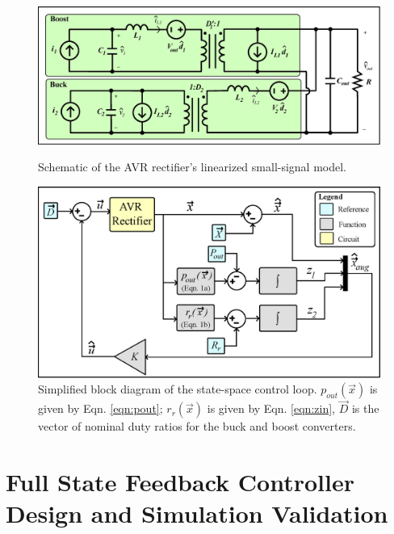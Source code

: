 \documentclass[journal, onecolumn, final, letterpaper, 11pt]{IEEEtran}
\begin{document}
\begin{figure}[b]
\vspace{-0.4 cm}
\centering
\begin{minipage}{.5\textwidth}
  \centering
  \includegraphics[width=\linewidth]{figures/avr_ss_model_schematic_eps.eps}
  \caption{Schematic of the AVR rectifier's linearized small-signal model.}
  \label{fig:small_signal}
\end{minipage}%
\begin{minipage}{.5\textwidth}
  \centering
  \includegraphics[width=0.95\linewidth]{figures/block_diagram_eps.eps}
  \caption{Simplified block diagram of the state-space control loop. $p_{out}(\vec{x})$ is given by Eqn. \ref{eqn:pout}; $r_r(\vec{x})$ is given by Eqn. \ref{eqn:zin}, $\vec{D}$ is the vector of nominal duty ratios for the buck and boost converters.}
  \label{fig:block_diagram}
\end{minipage}
\vspace{-0.4cm}
\end{figure}

\section{Full State Feedback Controller Design and Simulation Validation}
\label{sec:control}
\end{document}
